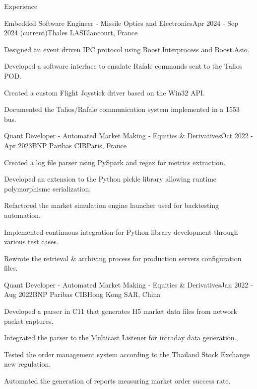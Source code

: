 \documentclass[
	a4paper, %
	10pt, %
]{resume} %
\def\CC{{C\nolinebreak[4]\hspace{-.05em}\raisebox{.4ex}{\tiny\bf ++}}}
\begin{document}
\begin{rSection}{Experience}

	\begin{rSubsection}{Embedded Software Engineer - Missile Optics and Electronics}{Apr 2024 - Sep 2024 (current)}{Thales LAS}{Elancourt, France}
    \item Designed an event driven IPC protocol using Boost.Interprocess and Boost.Asio.
    \item Developed a software interface to emulate Rafale commands sent to the Talios POD.
    \item Created a custom Flight Joystick driver based on the Win32 API.
    \item Documented the Talios/Rafale communication system implemented in a 1553 bus.
	\end{rSubsection}

	\begin{rSubsection}{Quant Developer - Automated Market Making - Equities \& Derivatives}{Oct 2022 - Apr 2023}{BNP Paribas CIB}{Paris, France}
		\item Created a log file parser using PySpark and regex for metrics extraction.
		\item Developed an extension to the Python pickle library allowing runtime polymorphisme serialization.
		\item Refactored the market simulation engine launcher used for backtesting automation.
		\item Implemented continuous integration for Python library development through various test cases.
		\item Rewrote the retrieval \& archiving process for production servers configuration files.
	\end{rSubsection}

	\begin{rSubsection}{Quant Developer - Automated Market Making - Equities \& Derivatives}{Jan 2022 - Aug 2022}{BNP Paribas CIB}{Hong Kong SAR, China}
    \item Developed a parser in \CC11 that generates H5 market data files from network packet captures.
		\item Integrated the parser to the Multicast Listener for intraday data generation.
		\item Tested the order management system according to the Thailand Stock Exchange new regulation.
		\item Automated the generation of reports measuring market order success rate.
	\end{rSubsection}

\end{rSection}
\end{document}
